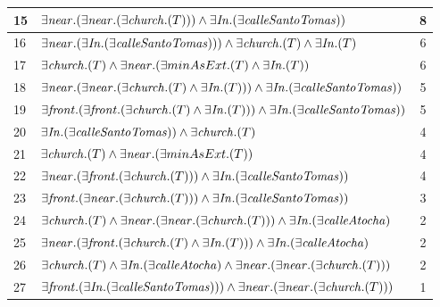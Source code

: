 \begin{table}[h]
\begin{center}
\begin{tabular}{|l|l|c|}
15&$\exists  \mathit{near}.(\exists \mathit{near}.(\exists \mathit{church}.(T))) \land \exists \mathit{In} .(\exists \mathit{calleSantoTomas}))$ &8\\ \hline

16&$\exists  \mathit{near}.(\exists \mathit{In} .(\exists \mathit{calleSantoTomas}))) \land \exists \mathit{church}.(T) \land \exists \mathit{In} .(T)$ &6\\ \hline

17&$\exists \mathit{church}.(T) \land \exists \mathit{near} .(\exists minAsExt .(T) \land \exists \mathit{In} .(T))$ &6\\ \hline

18&$\exists  \mathit{near}.(\exists \mathit{near}.(\exists \mathit{church}.(T) \land \exists \mathit{In} .(T))) \land \exists \mathit{In} .(\exists \mathit{calleSantoTomas}))$ &5\\ \hline

19&$\exists \mathit{front}.(\exists \mathit{front}.(\exists \mathit{church}.(T) \land \exists \mathit{In} .(T))) \land \exists \mathit{In} .(\exists \mathit{calleSantoTomas}))$ &5\\ \hline

20&$\exists  \mathit{In} .(\exists \mathit{calleSantoTomas})) \land \exists \mathit{church}.(T)$ &4\\ \hline

21&$\exists \mathit{church}.(T) \land \exists \mathit{near} .(\exists minAsExt .(T))$ &4\\ \hline

22&$\exists  \mathit{near}.(\exists \mathit{front}.(\exists \mathit{church}.(T))) \land \exists \mathit{In} .(\exists \mathit{calleSantoTomas}))$ &4\\ \hline

23&$\exists \mathit{front}.(\exists \mathit{near}.(\exists \mathit{church}.(T))) \land \exists \mathit{In} .(\exists \mathit{calleSantoTomas}))$ &3\\ \hline

24&$\exists \mathit{church}.(T) \land \exists \mathit{near}.(\exists \mathit{near}.(\exists \mathit{church}.(T))) \land \exists \mathit{In} .(\exists \mathit{calleAtocha})$ &2\\ \hline

25&$\exists  \mathit{near}.(\exists \mathit{front}.(\exists \mathit{church}.(T) \land \exists \mathit{In} .(T))) \land \exists \mathit{In} .(\exists \mathit{calleAtocha})$ &2\\ \hline

26&$\exists \mathit{church}.(T) \land \exists \mathit{In} .(\exists \mathit{calleAtocha}) \land \exists \mathit{near}.(\exists \mathit{near}.(\exists \mathit{church}.(T)))$ &2\\ \hline

27&$\exists \mathit{front}.(\exists \mathit{In} .(\exists \mathit{calleSantoTomas}))) \land \exists \mathit{near}.(\exists \mathit{near}.(\exists \mathit{church}.(T)))$ &1\\ \hline


\end{tabular}
\end{center}
\end{table}
